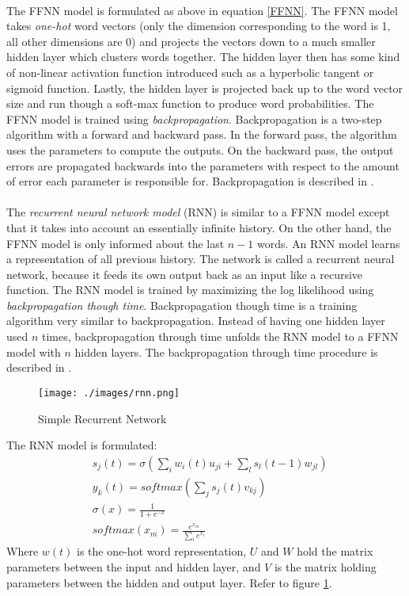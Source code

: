 \paragraph{}
The FFNN model is formulated as above in equation \ref{FFNN}. The FFNN model takes \emph{one-hot} word vectors (only the dimension corresponding to the word is 1, all other dimensions are 0) and projects the vectors down to a much smaller hidden layer which clusters words together. The hidden layer then has some kind of non-linear activation function introduced such as a hyperbolic tangent or sigmoid function. Lastly, the hidden layer is projected back up to the word vector size and run though a soft-max function to produce word probabilities. The FFNN model is trained using \emph{backpropagation}. Backpropagation is a two-step algorithm with a forward and backward pass. In the forward pass, the algorithm uses the parameters to compute the outputs. On the backward pass, the output errors are propagated backwards into the parameters with respect to the amount of error each parameter is responsible for. Backpropagation is described in \cite{Bengio2003}.

\paragraph{}
The \emph{recurrent neural network model} (RNN) is similar to a FFNN model except that it takes into account an essentially infinite history. On the other hand, the FFNN model is only informed about the last $n-1$ words. An RNN model learns a representation of all previous history. The network is called a recurrent neural network, because it feeds its own output back as an input like a recursive function. The RNN model is trained by maximizing the log likelihood using \emph{backpropagation though time}. Backpropagation though time is a training algorithm very similar to backpropagation. Instead of having one hidden layer used $n$ times, backpropagation through time unfolds the RNN model to a FFNN model with $n$ hidden layers. The backpropagation through time procedure is described in \cite{Mikolov2012}.

\begin{figure}
\centering
\texttt{[image: ./images/rnn.png]}
\caption{Simple Recurrent Network \cite[pg. 34]{Mikolov2012}}
\label{fig:RNNfigure}
\end{figure}

The RNN model is formulated:
\begin{align}
&s_j(t) = \sigma \left( \sum_i w_i(t) u_{ji} + \sum_l s_l (t-1) w_{jl} \right)
\\
&y_k(t) = softmax \left( \sum_j s_j(t) v_{kj} \right)
\\ 
&\sigma(x) = \frac{1}{1+e^{-x}} \nonumber
\\ 
&softmax(x_m) = \frac{e^{x_m} }{ \sum_i e^{x_i} }  \nonumber
\end{align}
Where $w(t)$ is the one-hot word representation, $U$ and $W$ hold the matrix parameters between the input and hidden layer, and $V$ is the matrix holding parameters between the hidden and output layer. Refer to figure \ref{fig:RNNfigure}.

